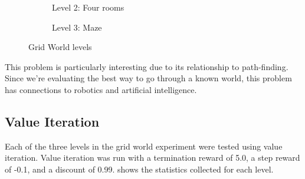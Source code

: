 \documentclass{article}
\begin{document}
\begin{figure}[htb]
\begin{subfigure}{0.3\textwidth}
          \caption{Level 2: Four rooms}
        \end{subfigure}\hfil
        \begin{subfigure}{0.3\textwidth}
          \caption{Level 3: Maze}
        \end{subfigure}

      \caption{Grid World levels}
      \label{fig:gw-domain}
      \end{figure}

      This problem is particularly interesting due to its relationship to path-finding. Since we're evaluating the best way to go through a known world, this problem has connections to robotics and artificial intelligence.

    \subsection{Value Iteration}
      Each of the three levels in the grid world experiment were tested using value iteration. Value iteration was run with a termination reward of 5.0, a step reward of -0.1, and a discount of 0.99.  shows the statistics collected for each level.
\end{document}

